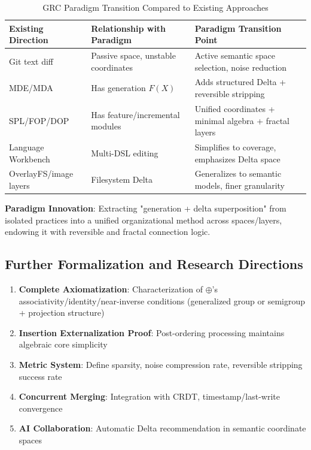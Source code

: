 \documentclass[11pt]{article}
\begin{document}
\begin{table}[htbp]
\centering
\small
\caption{GRC Paradigm Transition Compared to Existing Approaches}
\begin{tabularx}{\textwidth}{>{\raggedright\arraybackslash}X >{\raggedright\arraybackslash}X >{\raggedright\arraybackslash}X}
\toprule
\textbf{Existing Direction} & \textbf{Relationship with Paradigm} & \textbf{Paradigm Transition Point} \\
\midrule
Git text diff & Passive space, unstable coordinates & Active semantic space selection, noise reduction \\
\addlinespace
MDE/MDA & Has generation $F(X)$ & Adds structured Delta + reversible stripping \\
\addlinespace
SPL/FOP/DOP & Has feature/incremental modules & Unified coordinates + minimal algebra + fractal layers \\
\addlinespace
Language Workbench & Multi-DSL editing & Simplifies to coverage, emphasizes Delta space \\
\addlinespace
OverlayFS/image layers & Filesystem Delta & Generalizes to semantic models, finer granularity \\
\bottomrule
\end{tabularx}
\end{table}

\textbf{Paradigm Innovation}: Extracting "generation + delta superposition" from isolated practices into a unified organizational method across spaces/layers, endowing it with reversible and fractal connection logic.

\subsection{Further Formalization and Research Directions}

\begin{enumerate}
\item \textbf{Complete Axiomatization}: Characterization of $\oplus$'s associativity/identity/near-inverse conditions (generalized group or semigroup + projection structure)
\item \textbf{Insertion Externalization Proof}: Post-ordering processing maintains algebraic core simplicity
\item \textbf{Metric System}: Define sparsity, noise compression rate, reversible stripping success rate
\item \textbf{Concurrent Merging}: Integration with CRDT, timestamp/last-write convergence
\item \textbf{AI Collaboration}: Automatic Delta recommendation in semantic coordinate spaces
\end{enumerate}
\end{document}
